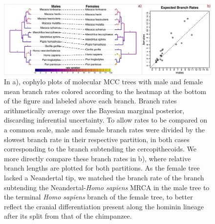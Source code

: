 \documentclass[10pt, twocolumn, twoside]{article}
\begin{document}
\begin{figure}[h]
\centering
\includegraphics[width=160mm]{figures/harvati_figure4_final.pdf}
\caption[Rate Variation in Catarrhine Cranial Evolution]{In a), cophylo plots of molecular MCC trees with male and female mean branch rates colored according to the heatmap at the bottom of the figure and labeled above each branch. Branch rates arithmetically average over the Bayesian marginal posterior, discarding inferential uncertainty. To allow rates to be compared on a common scale, male and female branch rates were divided by the slowest branch rate in their respective partition, in both cases corresponding to the branch subtending the cercopithecoids. We more directly compare these branch rates in b), where relative branch lengths are plotted for both partitions. As the female tree lacked a Neandertal tip, we matched the branch rate of the branch subtending the Neandertal-\textit{Homo sapiens} MRCA in the male tree to the terminal \textit{Homo sapiens} branch of the female tree, to better reflect the cranial differentiation present along the hominin lineage after its split from that of the chimpanzee. \label{overflow}
\label{fig:harvatiFigure4}}
\end{figure}
\end{document}
